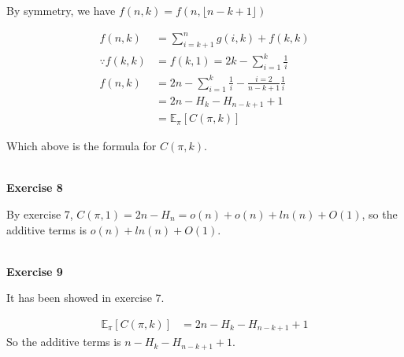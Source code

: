 \documentclass{article}
\begin{document}
    By symmetry, we have $f(n,k) = f(n, \lfloor n-k+1 \rfloor  )$
    
\begin{align}
    f(n,k) &= \sum_{i=k+1}^{n} g(i,k) + f(k,k)\\
    \because f(k,k) &= f(k,1) = 2k - \sum_{i=1}^{k} \frac{1}{i}\\
    f(n,k) &= 2n - \sum_{i=1}^{k} \frac{1}{i} - \frac{i=2}{n-k+1} \frac{1}{i}\\
    &= 2n - H_{k} - H_{n-k+1} + 1\\
    &= \mathds{E}_{\pi} [C(\pi , k)]
\end{align}

Which above is the formula for $C(\pi, k)$.

~\\
\textbf{Exercise 8}

By exercise 7, $C(\pi ,1) = 2n - H_{n} = o(n) + o(n) + ln(n) + O(1)$, so the additive terms is $o(n) + ln(n) + O(1)$.

~\\
\textbf{Exercise 9}

It has been showed in exercise 7.

\begin{align*}
     \mathds{E}_{\pi} [C(\pi , k)]&= 2n - H_{k} - H_{n-k+1} + 1
\end{align*}
   So the additive terms is $n - H_{k} - H_{n-k+1} + 1$.
\end{document}
